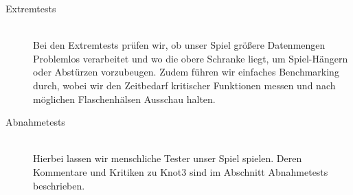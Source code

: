 \begin{description}
\clearpage
	
	
	\item[Extremtests] \hfill
	\\
	
	Bei den Extremtests prüfen wir, ob unser Spiel  größere Datenmengen Problemlos verarbeitet und wo die obere Schranke liegt, um Spiel-Hängern oder Abstürzen vorzubeugen. Zudem führen wir einfaches Benchmarking durch, wobei wir den Zeitbedarf kritischer Funktionen messen und nach möglichen Flaschenhälsen Ausschau halten.\\


	\item[Abnahmetests] \hfill
	\\
	
	Hierbei lassen wir menschliche Tester unser Spiel spielen. Deren Kommentare und Kritiken zu Knot3 sind im Abschnitt Abnahmetests beschrieben.\\
		
\end{description}







